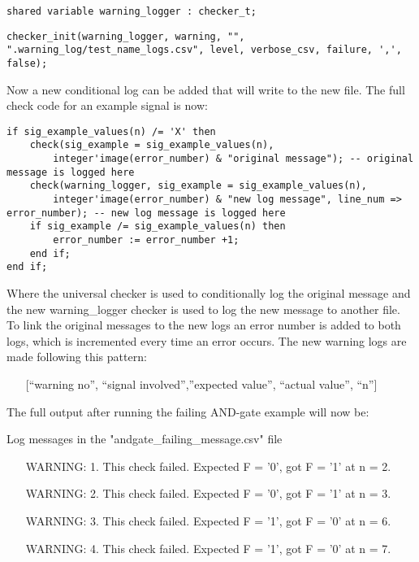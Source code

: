 \begin{lstlisting}[style=vhdl, caption={Custom checker declaration}, label={vhdl:new_checker_declaration}]
shared variable warning_logger : checker_t;
\end{lstlisting}\noindent
\begin{lstlisting}[style=vhdl, caption={Custom checker initialisation}, label={vhdl:new_checker_init}]
checker_init(warning_logger, warning, "", ".warning_log/test_name_logs.csv", level, verbose_csv, failure, ',', false);
\end{lstlisting}\noindent
Now a new conditional log can be added that will write to the new file. The full check code for an example signal is now:
\begin{lstlisting}[style=vhdl, caption={Improved signal checking}, label={vhdl:improved_check}]
if sig_example_values(n) /= 'X' then
	check(sig_example = sig_example_values(n), 
		integer'image(error_number) & "original message"); -- original message is logged here
	check(warning_logger, sig_example = sig_example_values(n), 
		integer'image(error_number) & "new log message", line_num => error_number); -- new log message is logged here
	if sig_example /= sig_example_values(n) then
		error_number := error_number +1;
	end if;
end if;
\end{lstlisting}\noindent
Where the universal checker is used to conditionally log the original message and the new warning\_logger checker is used to log the new message to another file. To link the original messages to the new logs an error number is added to both logs, which is incremented every time an error occurs.
\npar
The new warning logs are made following this pattern:
\begin{customenv}
	\begin{itemize}
		\centering
		\item [] [“warning no”, “signal involved”,”expected value”, “actual value”, “n”] 
	\end{itemize}
\end{customenv}\newpage\noindent
The full output after running the failing AND-gate example will now be:
\begin{customenv}
	\caption{Log messages in the "andgate\_failing\_message.csv" file}
	\begin{itemize}
		\centering
		\item [WARNING: 1.] This check failed. Expected F = '0', got F = '1' at n = 2.
		\item [WARNING: 2.] This check failed. Expected F = '0', got F = '1' at n = 3.
		\item [WARNING: 3.] This check failed. Expected F = '1', got F = '0' at n = 6.
		\item [WARNING: 4.] This check failed. Expected F = '1', got F = '0' at n = 7.
	\end{itemize}
\end{customenv}
